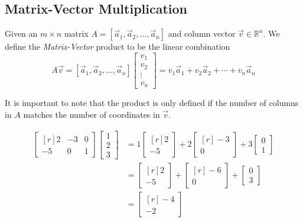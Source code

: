 \subsection{Matrix-Vector Multiplication}

\begin{definition}
Given an $m \times n$ matrix $A=[\vec{a}_1, \vec{a}_2, \ldots, \vec{a}_n]$ and 
column vector $\vec{v} \in \mathbb{R}^n$. We define the \emph{Matrix-Vector} 
product to be the linear combination 
\[
A\vec{v}=[\vec{a}_1, \vec{a}_2, \ldots ,\vec{a}_n]\begin{bmatrix}v_1 \\ v_2 \\ 
\vdots \\ v_n \end{bmatrix}=v_1\vec{a}_1+v_2\vec{a}_2+\cdots+v_n\vec{a}_n
\]
\end{definition} 
\begin{remark}
It is important to note that the product is only defined if the number of columns in $A$ matches the number of coordinates in $\vec{v}$.
\end{remark}

\begin{example}
\begin{align*}
\begin{bmatrix*}[r]
2 & -3 & 0 \\
-5 & 0 & 1 
\end{bmatrix*} 
\begin{bmatrix}1\\ 2 \\ 3 \end{bmatrix}
&=1\begin{bmatrix*}[r]2\\-5\end{bmatrix*} 
+2\begin{bmatrix*}[r]-3\\0\end{bmatrix*} 
+3\begin{bmatrix}0\\1\end{bmatrix}\\
&=\begin{bmatrix*}[r]2\\-5\end{bmatrix*}
+\begin{bmatrix*}[r]-6\\0\end{bmatrix*}+\begin{bmatrix}0\\3\end{bmatrix}\\
&=\begin{bmatrix*}[r]-4\\-2\end{bmatrix*}
\end{align*}
\end{example}

